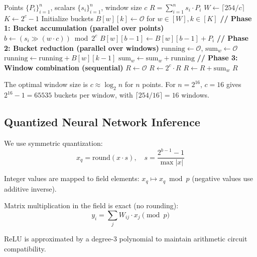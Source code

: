 \documentclass[11pt,a4paper]{article}
\begin{document}
\begin{algorithm}
\caption{GPU-Parallel Pippenger MSM}
\begin{algorithmic}[1]
\REQUIRE Points $\{P_i\}_{i=1}^n$, scalars $\{s_i\}_{i=1}^n$, window size $c$
\ENSURE $R = \sum_{i=1}^n s_i \cdot P_i$
\STATE $W \leftarrow \lceil 254/c \rceil$ 
\STATE $K \leftarrow 2^c - 1$ 
\STATE Initialize buckets $B[w][k] \leftarrow \mathcal{O}$ for $w \in [W], k \in [K]$
\STATE \textbf{// Phase 1: Bucket accumulation (parallel over points)}
    \STATE $b \leftarrow (s_i \gg (w \cdot c)) \bmod 2^c$
      \STATE $B[w][b-1] \leftarrow B[w][b-1] + P_i$
    \ENDIF
  \ENDFOR
\ENDFOR
\STATE \textbf{// Phase 2: Bucket reduction (parallel over windows)}
  \STATE $\text{running} \leftarrow \mathcal{O}$, $\text{sum}_w \leftarrow \mathcal{O}$
    \STATE $\text{running} \leftarrow \text{running} + B[w][k-1]$
    \STATE $\text{sum}_w \leftarrow \text{sum}_w + \text{running}$
  \ENDFOR
\ENDFOR
\STATE \textbf{// Phase 3: Window combination (sequential)}
\STATE $R \leftarrow \mathcal{O}$
  \STATE $R \leftarrow 2^c \cdot R$ 
  \STATE $R \leftarrow R + \text{sum}_w$
\ENDFOR
\RETURN $R$
\end{algorithmic}
\end{algorithm}

The optimal window size is $c \approx \log_2 n$ for $n$ points.
For $n = 2^{16}$, $c = 16$ gives $2^{16} - 1 = 65535$ buckets per window,
with $\lceil 254/16 \rceil = 16$ windows.

\subsection{Quantized Neural Network Inference}

We use symmetric quantization:
\[
  x_q = \text{round}(x \cdot s), \quad
  s = \frac{2^{b-1} - 1}{\max |x|}
\]

Integer values are mapped to field elements:
$x_q \mapsto x_q \bmod p$ (negative values use additive inverse).

Matrix multiplication in the field is exact (no rounding):
\[
  y_i = \sum_j W_{ij} \cdot x_j \pmod{p}
\]

ReLU is approximated by a degree-3 polynomial to maintain
arithmetic circuit compatibility.
\end{document}
